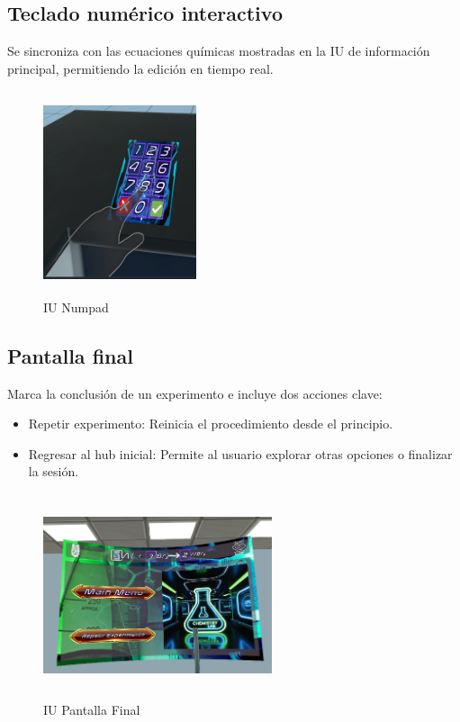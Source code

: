 \subsection{Teclado numérico interactivo}
Se sincroniza con las ecuaciones químicas mostradas en la IU de información principal, permitiendo la edición en tiempo real.
\begin{figure}[thbp]
    \centering
    \includegraphics[width=0.4\textwidth, height = 6cm]{img/chapter04/Num_Pad.png}
    \caption{IU Numpad}
    \label{fig:Numpad_IU}
\end{figure}
\subsection{Pantalla final}
Marca la conclusión de un experimento e incluye dos acciones clave:
\begin{itemize}
    \item Repetir experimento: Reinicia el procedimiento desde el principio.
    \item Regresar al hub inicial: Permite al usuario explorar otras opciones o finalizar la sesión.
\end{itemize}
\begin{figure}[thbp]
    \centering
    \includegraphics[width=0.6\textwidth, height = 6cm]{img/chapter04/UI_Final.png}
    \caption{IU Pantalla Final}
    \label{fig:Final_IU}
\end{figure}
\newpage
